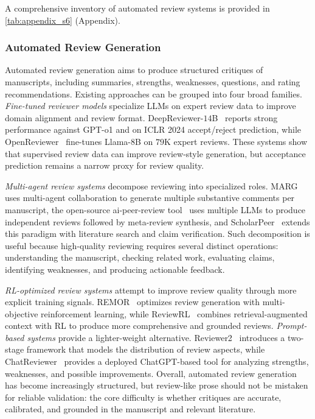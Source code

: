 A comprehensive inventory of automated review systems is provided in \cref{tab:appendix_s6} (Appendix).



\subsubsection{Automated Review Generation}
\label{sec:review_gen}

Automated review generation aims to produce structured critiques of manuscripts, including summaries, strengths, weaknesses, questions, and rating recommendations. Existing approaches can be grouped into four broad families. \emph{Fine-tuned reviewer models} specialize LLMs on expert review data to improve domain alignment and review format. DeepReviewer-$14$B~\cite{deepreviewer2025} reports strong performance against GPT-o1 and on ICLR 2024 accept/reject prediction, while OpenReviewer~\cite{openreviewer2025} fine-tunes Llama-$8$B on $79$K expert reviews. These systems show that supervised review data can improve review-style generation, but acceptance prediction remains a narrow proxy for review quality.

\emph{Multi-agent review systems} decompose reviewing into specialized roles. MARG~\cite{darcy2024marg} uses multi-agent collaboration to generate multiple substantive comments per manuscript, the open-source ai-peer-review tool~\cite{poldrack2024aireview} uses multiple LLMs to produce independent reviews followed by meta-review synthesis, and ScholarPeer~\cite{scholarpeer2026} extends this paradigm with literature search and claim verification. Such decomposition is useful because high-quality reviewing requires several distinct operations: understanding the manuscript, checking related work, evaluating claims, identifying weaknesses, and producing actionable feedback.

\emph{RL-optimized review systems} attempt to improve review quality through more explicit training signals. REMOR~\cite{remor2025} optimizes review generation with multi-objective reinforcement learning, while ReviewRL~\cite{reviewrl2025} combines retrieval-augmented context with RL to produce more comprehensive and grounded reviews. \emph{Prompt-based systems} provide a lighter-weight alternative. Reviewer2~\cite{reviewer2024} introduces a two-stage framework that models the distribution of review aspects, while ChatReviewer~\cite{chatreviewer2023} provides a deployed ChatGPT-based tool for analyzing strengths, weaknesses, and possible improvements. Overall, automated review generation has become increasingly structured, but review-like prose should not be mistaken for reliable validation: the core difficulty is whether critiques are accurate, calibrated, and grounded in the manuscript and relevant literature.




